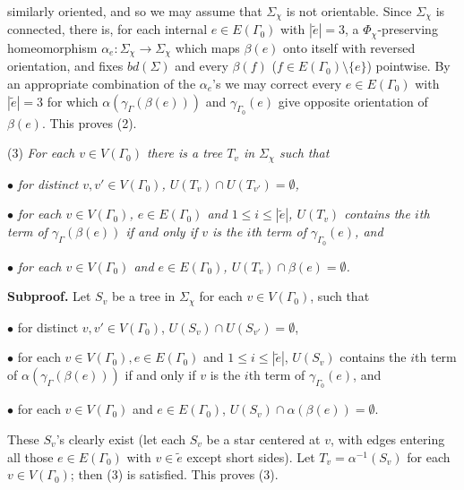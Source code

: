 \noindent similarly oriented, and so we may assume that $\Sigma_\chi$ is not orientable. Since $\Sigma_\chi$ is connected, there is, for each internal $e \in E(\Gamma_0)$ with $|\tilde{e}| = 3$, a $\Phi_\chi$-preserving homeomorphism $\alpha_e \colon \Sigma_\chi \to \Sigma_\chi$ which maps $\beta(e)$ onto itself with reversed orientation, and fixes $bd(\Sigma)$ and every $\beta(f)$ ($f \in E(\Gamma_0)\setminus \{e\}$) pointwise. By an appropriate combination of the $\alpha_e$'s we may correct every $e \in E(\Gamma_0)$ with $|\tilde{e}| = 3$ for which $\alpha(\gamma_\Gamma(\beta(e)))$ and $\gamma_{\Gamma_0}(e)$ give opposite orientation of $\beta(e)$. This proves (2).

\hspace*{12pt}(3) \textit{For each $v \in V(\Gamma_0)$ there is a tree $T_v$ in $\Sigma_\chi$ such that}

\hspace*{12pt}$\bullet$ \textit{for distinct $v, v' \in V(\Gamma_0)$, $U(T_v) \cap U(T_{v'}) = \emptyset$,}

\hspace*{12pt}$\bullet$ \textit{for each $v \in V(\Gamma_0)$, $e \in E(\Gamma_0)$ and $1 \le i \le |\tilde{e}|$, $U(T_v)$ contains the $i$th term of $\gamma_\Gamma(\beta(e))$ if and only if $v$ is the $i$th term of $\gamma_{\Gamma_0}(e)$, and}

\hspace*{12pt}$\bullet$ \textit{for each $v \in V(\Gamma_0)$ and $e \in E(\Gamma_0)$, $U(T_v) \cap \beta(e) = \emptyset$.}

\textbf{Subproof.} Let $S_v$ be a tree in $\Sigma_\chi$ for each $v \in V(\Gamma_0)$, such that

\hspace*{12pt}$\bullet$ for distinct $v, v' \in V(\Gamma_0)$, $U(S_v) \cap U(S_{v'}) = \emptyset$,

\hspace*{12pt}$\bullet$ for each $v \in V(\Gamma_0), e \in E(\Gamma_0)$ and $1 \le i \le |\tilde{e}|$, $U(S_v)$ contains the $i$th term of $\alpha(\gamma_\Gamma(\beta(e)))$ if and only if $v$ is the $i$th term of $\gamma_{\Gamma_0}(e)$, and

\hspace*{12pt}$\bullet$ for each $v \in V(\Gamma_0)$ and $e \in E(\Gamma_0)$, $U(S_v) \cap \alpha(\beta(e)) = \emptyset$.

These $S_v$'s clearly exist (let each $S_v$ be a star centered at $v$, with edges entering all those $e \in E(\Gamma_0)$ with $v \in \tilde{e}$ except short sides). Let $T_v = \alpha^{-1}(S_v)$ for each $v \in V(\Gamma_0)$; then (3) is satisfied. This proves (3).

